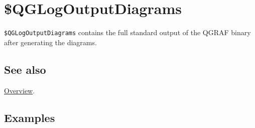 \documentclass[../FeynHelpersManual.tex]{subfiles}
\begin{document}
\hypertarget{dollarqglogoutputdiagrams}{
\section{\$QGLogOutputDiagrams}\label{dollarqglogoutputdiagrams}}

\texttt{\$QGLogOutputDiagrams} contains the full standard output of the
QGRAF binary after generating the diagrams.

\subsection{See also}

\hyperlink{toc}{Overview}.

\subsection{Examples}
\end{document}
